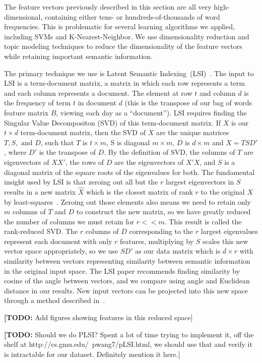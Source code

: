 \documentclass[10pt, twocolumn]{article}
\def\TODO#1{\noindent\textbf{[TODO:} #1]}
\begin{document}
The feature vectors previously described in this section are all very high-dimensional, containing either tens- or hundreds-of-thousands of word frequencies. This is problematic for several learning algorithms we applied, including SVMs and K-Nearest-Neighbor. We use dimensionality reduction and topic modeling techniques to reduce the dimensionality of the feature vectors while retaining important semantic information.

The primary technique we use is Latent Semantic Indexing~(LSI)~\cite{lsi}. The input to LSI is a term-document matrix, a matrix in which each row represents a term and each column represents a document. The element at row $t$ and column $d$ is the frequency of term $t$ in document $d$ (this is the transpose of our bag of words feature matrix $B$, viewing each day as a ``document''). LSI requires finding the Singular Value Decompositon (SVD) of this term-document matrix. If $X$ is our $t \times d$ term-document matrix, then the SVD of $X$ are the unique matrices $T, S, \text{ and } D$, such that $T$ is $t \times m$, S is diagonal $m \times m$, $D$ is $d \times m$ and $X = T S D'$, where $D'$ is the transpose of $D$. By the definition of SVD, the columns of $T$ are eigenvectors of $X X'$, the rows of $D$ are the eigenvectors of $X' X$, and $S$ is a diagonal matrix of the square roots of the eigenvalues for both. The fundamental insight used by LSI is that zeroing out all but the $r$ largest eigenvectors in $S$ results in a new matrix $\hat{X}$ which is the closest matrix of rank $r$ to the original $X$ by least-squares~\cite{lsi}. Zeroing out those elements also means we need to retain only $m$ columns of $T$ and $D$ to construct the new matrix, so we have greatly reduced the number of columns we must retain for $r << m$. This result is called the rank-reduced SVD. The $r$ columns of $D$ corresponding to the $r$ largest eigenvalues represent each document with only $r$ features, multiplying by $S$ scales this new vector space appropriately, so we use $S D'$ as our data matrix which is $d \times r$ with similarity between vectors representing similarity between semantic information in the original input space. The LSI paper recommends finding similarity by cosine of the angle between vectors, and we compare using angle and Euclidean distance in our results. New input vectors can be projected into this new space through a method described in~\cite{lsi}.

\TODO{Add figures showing features in this reduced space}

\TODO{Should we do PLSI? Spent a lot of time trying to implement it, off the shelf at http://cs.gmu.edu/~pwang7/pLSI.html, we should use that and verify it is intractable for our dataset. Definitely mention it here.} 
\end{document}
